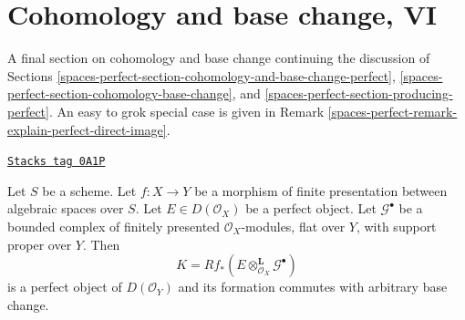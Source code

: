 \section{Cohomology and base change, VI}
\label{spaces-perfect-section-cohomology-and-base-change-final}
A final section on cohomology and base change continuing
the discussion of Sections
\ref{spaces-perfect-section-cohomology-and-base-change-perfect},
\ref{spaces-perfect-section-cohomology-base-change}, and
\ref{spaces-perfect-section-producing-perfect}.
An easy to grok special case is given in
Remark \ref{spaces-perfect-remark-explain-perfect-direct-image}.

\begin{lemma}
\label{spaces-perfect-lemma-base-change-tensor-perfect}
\href{https://stacks.math.columbia.edu/tag/0A1P}{\texttt{Stacks tag 0A1P}}

Let $S$ be a scheme. Let $f : X \to Y$ be a morphism of finite presentation
between algebraic spaces over $S$. Let $E \in D(\mathcal{O}_X)$ be a perfect
object. Let $\mathcal{G}^\bullet$ be a bounded complex of finitely presented
$\mathcal{O}_X$-modules, flat over $Y$, with support proper over $Y$. Then
$$
K = Rf_*(E \otimes_{\mathcal{O}_X}^\mathbf{L} \mathcal{G}^\bullet)
$$
is a perfect object of $D(\mathcal{O}_Y)$ and its formation
commutes with arbitrary base change.
\end{lemma}

